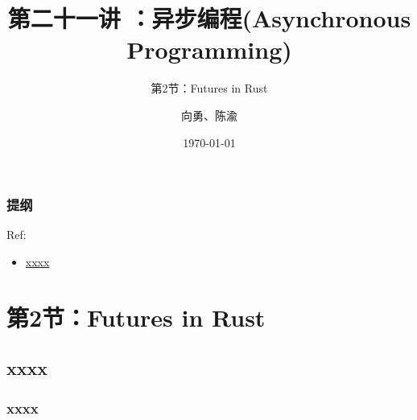 


\title[第21讲]{第二十一讲 ：异步编程(Asynchronous Programming)} %
\subtitle{第2节：Futures in Rust}
\author{向勇、陈渝} %
\date{\today} %



\begin{frame}
\titlepage %
\end{frame}

\begin{frame}
\frametitle{提纲} %
\tableofcontents %

Ref:
    \begin{itemize}
        \item \href{}{xxxx}
    \end{itemize}

\end{frame}
\section{第2节：Futures in Rust} %
\subsection{xxxx} %
\begin{frame}[fragile]
    \frametitle{xxxx}
\end{frame}

